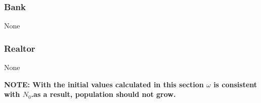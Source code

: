 \subsubsection{Bank}
\begin{description}
\item[None] 
\end{description}

\subsubsection{Realtor}
\begin{description}
\item[None] 
\end{description}


\textbf{NOTE: With the initial values calculated in this section $\omega$ is consistent with $N_0$.as a result, population should not grow. }


